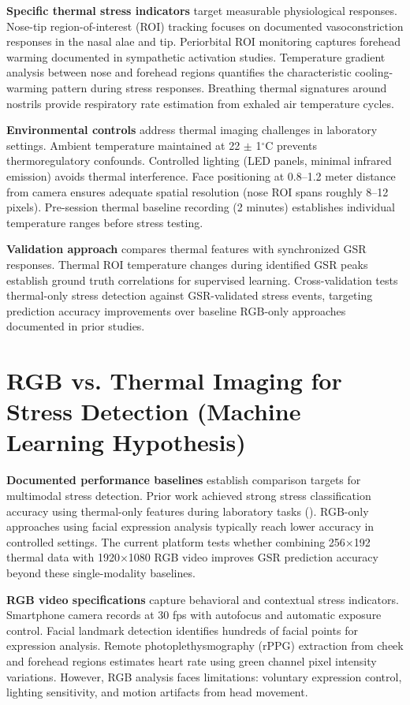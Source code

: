 \textbf{Specific thermal stress indicators} target measurable physiological responses. Nose-tip region-of-interest (ROI) tracking focuses on documented vasoconstriction responses in the nasal alae and tip. Periorbital ROI monitoring captures forehead warming documented in sympathetic activation studies. Temperature gradient analysis between nose and forehead regions quantifies the characteristic cooling-warming pattern during stress responses. Breathing thermal signatures around nostrils provide respiratory rate estimation from exhaled air temperature cycles.

\textbf{Environmental controls} address thermal imaging challenges in laboratory settings. Ambient temperature maintained at 22 $\pm$ 1$^\circ$C prevents thermoregulatory confounds. Controlled lighting (LED panels, minimal infrared emission) avoids thermal interference. Face positioning at 0.8--1.2 meter distance from camera ensures adequate spatial resolution (nose ROI spans roughly 8--12 pixels). Pre-session thermal baseline recording (2 minutes) establishes individual temperature ranges before stress testing.

\textbf{Validation approach} compares thermal features with synchronized GSR responses. Thermal ROI temperature changes during identified GSR peaks establish ground truth correlations for supervised learning. Cross-validation tests thermal-only stress detection against GSR-validated stress events, targeting prediction accuracy improvements over baseline RGB-only approaches documented in prior studies.

\section{RGB vs. Thermal Imaging for Stress Detection (Machine Learning Hypothesis)}
\textbf{Documented performance baselines} establish comparison targets for multimodal stress detection. Prior work achieved strong stress classification accuracy using thermal-only features during laboratory tasks (\citep{ref5}). RGB-only approaches using facial expression analysis typically reach lower accuracy in controlled settings. The current platform tests whether combining 256$\times$192 thermal data with 1920$\times$1080 RGB video improves GSR prediction accuracy beyond these single-modality baselines.

\textbf{RGB video specifications} capture behavioral and contextual stress indicators. Smartphone camera records at 30 fps with autofocus and automatic exposure control. Facial landmark detection identifies hundreds of facial points for expression analysis. Remote photoplethysmography (rPPG) extraction from cheek and forehead regions estimates heart rate using green channel pixel intensity variations. However, RGB analysis faces limitations: voluntary expression control, lighting sensitivity, and motion artifacts from head movement.

